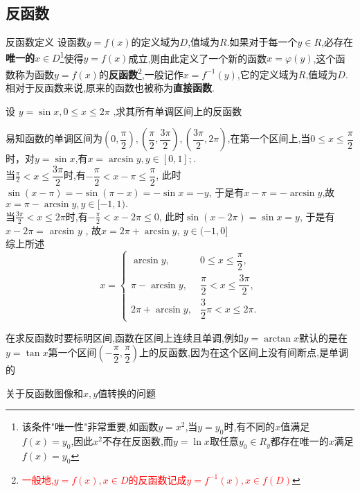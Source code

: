 \documentclass[8pt a4paper, oneside, UTF8]{ctexbook}  %
\begin{document}
\begin{sloppypar}
    \subsection{反函数}
    \begin{defn}{反函数定义}{}
        设函数$y=f(x)$的定义域为$D$,值域为$R$.如果对于每一个$y \in R $,必存在\textbf{唯一的$x \in D$}\footnote{该条件"唯一性"非常重要,如函数$y=x^2$,当$y=y_0$时,有不同的$x$值满足$f(x)=y_0$,因此$x^2$不存在反函数,而$y=\ln x$取任意$y_0 \in R_y$都存在唯一的$x$满足$f(x)=y_0$}\label{xxx1}使得$y=f(x)$成立,则由此定义了一个新的函数$x=\varphi(y)$,这个函数称为函数$y=f(x)$的\textbf{反函数}\footnote{\textcolor{red}{一般地,$y=f(x),x \in D$的反函数记成$y=f^{-1}\left(x\right),x\in f(D)$}},一般记作$x=f^{-1}(y)$,它的定义域为$R$,值域为$D$.相对于反函数来说,原来的函数也被称为\textbf{直接函数}.
    \end{defn}
    \begin{problem}
        设 $y=\sin x,0{\leqslant}x{\leqslant}2\pi$ ,求其所有单调区间上的反函数 
    \end{problem}
    \begin{solution}
        易知函数的单调区间为$(0,\dfrac{\pi}{2}),(\dfrac{\pi}{2},\dfrac{3 \pi}{2}),(\dfrac{3\pi}{2},2\pi)$,在第一个区间上,当$0\leqslant x\leqslant\dfrac\pi2$时，对$y=\sin x$,有$x=\arcsin y,y\in[0,1];$.\\
        当$\frac\pi2<x\leqslant\dfrac{3\pi}2$时,有$-\dfrac\pi2<x-\pi\leqslant\dfrac\pi2$, 此时$\sin(x-\pi)=-\sin(\pi-x)=-\sin x=-y$, 于是有$x-\pi=-\arcsin y$,故$x=\pi-\arcsin y,y\in[-1,1).$\\
        当$\frac{3\pi}{2}<x\leq2\pi$时,有$-\frac\pi2<x-2\pi\leqslant0$, 此时$\sin(x-2\pi)=\sin x=y$, 于是有$x-2\pi=$ arcsin $y$ , 故$x=2\pi+\arcsin y,\:y\in(-1,0]$ \\
        综上所述$$x=\begin{cases}\arcsin y ,&0\leqslant x\leqslant\dfrac{\pi}{2} ,\\ \pi-\arcsin y ,&\dfrac{\pi}{2}<x\leqslant\dfrac{3\pi}{2} ,\\ 2\pi+\arcsin y ,&\dfrac{3}{2}\pi<x\leqslant2\pi.\end{cases}$$
    \end{solution}
    \begin{note}
        在求反函数时要标明区间,函数在区间上连续且单调,例如$y=\arctan x$默认的是在$y=\tan x$第一个区间$(-\dfrac{\pi}{2},\dfrac{\pi}{2})$上的反函数,因为在这个区间上没有间断点,是单调的
    \end{note}
    \begin{criterion}{关于反函数图像和$x,y$值转换的问题}{}

\end{criterion}
\end{sloppypar}
\end{document}

